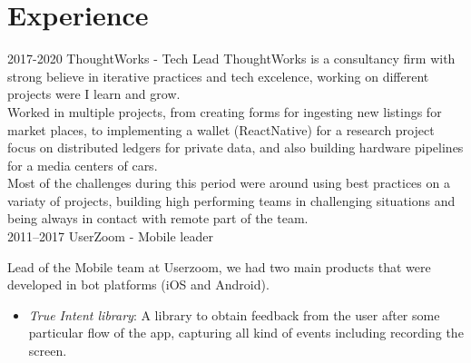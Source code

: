 \documentclass[]{friggeri-cv} %
\begin{document}
\section{Experience}
\begin{entrylist}
\entry
{2017-2020}
{ThoughtWorks - Tech Lead}
{}
{
  ThoughtWorks is a consultancy firm with strong believe in iterative practices
  and tech excelence, working on different projects were I learn and grow.
\\

  Worked in multiple projects, from creating forms for ingesting new listings
  for market places, to implementing a wallet (ReactNative) for a research project focus
  on distributed ledgers for private data, and also building hardware pipelines
  for a media centers of cars.
\\

  Most of the challenges during this period were around using best practices on
  a variaty of projects, building high performing teams in challenging
  situations and being always in contact with remote part of the team.
}
\\
\entry
{2011--2017}
{UserZoom - Mobile leader}
{}
{
  Lead of the Mobile team at Userzoom, we had two main products that were
  developed in bot platforms (iOS and Android).

\vspace{\parsep}
\begin{itemize}
\item \emph{True Intent library}: A library to obtain feedback from the user
  after some particular flow of the app, capturing all kind of events including
  recording the screen.


\end{itemize}}
\end{entrylist}
\end{document}
